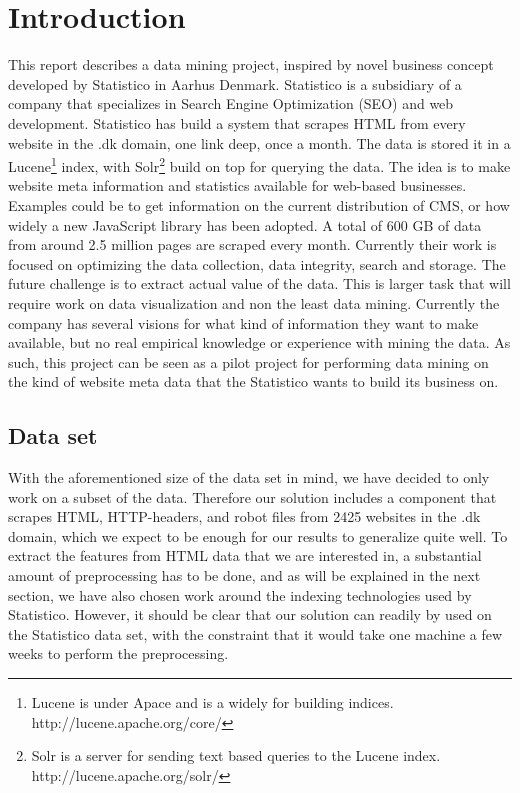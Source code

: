 \section{Introduction}
\label{sec:introduction}

This report describes a data mining project, inspired by novel business concept developed by Statistico in Aarhus Denmark. Statistico is a subsidiary of a company that specializes in Search Engine Optimization (SEO) and web development. Statistico has build a system that scrapes HTML from every website in the .dk domain, one link deep, once a month. The data is stored it in a Lucene\footnote{Lucene is under Apace and is a widely for building indices. http://lucene.apache.org/core/} index, with Solr\footnote{Solr is a server for sending text based queries to the Lucene index. http://lucene.apache.org/solr/} build on top for querying the data. The idea is to make website meta information and statistics available for web-based businesses. Examples could be to get information on the current distribution of CMS, or how widely a new JavaScript library has been adopted. A total of 600 GB of data from around 2.5 million pages are scraped every month. Currently their work is focused on optimizing the data collection, data integrity, search and storage.
The future challenge is to extract actual value of the data. This is larger task that will require work on data visualization and non the least data mining. Currently the company has several visions for what kind of information they want to make available, but no real empirical knowledge or experience with mining the data. As such, this project can be seen as a pilot project for performing data mining on the kind of website meta data that the Statistico wants to build its business on.

\subsection{Data set}
\label{subsec:data_set}
With the aforementioned size of the data set in mind, we have decided to only work on a subset of the data. Therefore our solution includes a component that scrapes HTML, HTTP-headers, and robot files from 2425 websites in the .dk domain, which we expect to be enough for our results to generalize quite well. To extract the features from HTML data that we are interested in, a substantial amount of preprocessing has to be done, and as will be explained in the next section, we have also chosen work around the indexing technologies used by Statistico. However, it should be clear that our solution can readily by used on the Statistico data set, with the constraint that it would take one machine a few weeks to perform the preprocessing.

